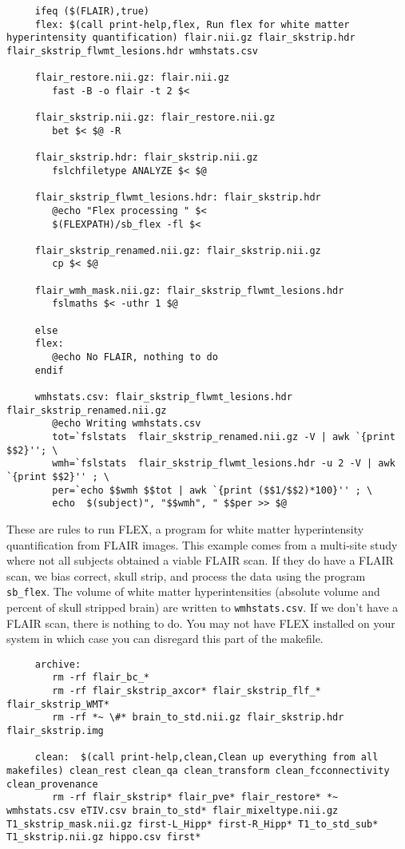 \begin{lstlisting}
	 ifeq ($(FLAIR),true)
	 flex: $(call print-help,flex, Run flex for white matter hyperintensity quantification) flair.nii.gz flair_skstrip.hdr flair_skstrip_flwmt_lesions.hdr wmhstats.csv

	 flair_restore.nii.gz: flair.nii.gz
		fast -B -o flair -t 2 $<

	 flair_skstrip.nii.gz: flair_restore.nii.gz
		bet $< $@ -R

	 flair_skstrip.hdr: flair_skstrip.nii.gz 
		fslchfiletype ANALYZE $< $@

	 flair_skstrip_flwmt_lesions.hdr: flair_skstrip.hdr
		@echo "Flex processing " $< 
		$(FLEXPATH)/sb_flex -fl $< 

	 flair_skstrip_renamed.nii.gz: flair_skstrip.nii.gz
		cp $< $@

	 flair_wmh_mask.nii.gz: flair_skstrip_flwmt_lesions.hdr
		fslmaths $< -uthr 1 $@

	 else
	 flex:
		@echo No FLAIR, nothing to do
	 endif

	 wmhstats.csv: flair_skstrip_flwmt_lesions.hdr flair_skstrip_renamed.nii.gz
		@echo Writing wmhstats.csv 
		tot=`fslstats  flair_skstrip_renamed.nii.gz -V | awk `{print $$2}''; \
		wmh=`fslstats  flair_skstrip_flwmt_lesions.hdr -u 2 -V | awk `{print $$2}'' ; \
		per=`echo $$wmh $$tot | awk `{print ($$1/$$2)*100}'' ; \
		echo  $(subject)", "$$wmh", " $$per >> $@ 
\end{lstlisting}

These are rules to run FLEX, a program for white matter hyperintensity
quantification from FLAIR images. This example comes from a multi-site
study where not all subjects obtained a viable FLAIR scan. If they do
have a FLAIR scan, we bias correct, skull strip, and process the data
using the program \texttt{sb_flex}.  The volume of white
matter hyperintensities (absolute volume and percent of skull stripped
brain) are written to \texttt{wmhstats.csv}. If we don't have a FLAIR
scan, there is nothing to do. You may not have FLEX installed on your
system in which case you can disregard this part of the makefile.


\begin{lstlisting}
	 archive:
		rm -rf flair_bc_*
		rm -rf flair_skstrip_axcor* flair_skstrip_flf_* flair_skstrip_WMT*
		rm -rf *~ \#* brain_to_std.nii.gz flair_skstrip.hdr flair_skstrip.img

	 clean:  $(call print-help,clean,Clean up everything from all makefiles) clean_rest clean_qa clean_transform clean_fcconnectivity clean_provenance
		rm -rf flair_skstrip* flair_pve* flair_restore* *~ wmhstats.csv eTIV.csv brain_to_std* flair_mixeltype.nii.gz T1_skstrip_mask.nii.gz first-L_Hipp* first-R_Hipp* T1_to_std_sub* T1_skstrip.nii.gz hippo.csv first*
\end{lstlisting}

